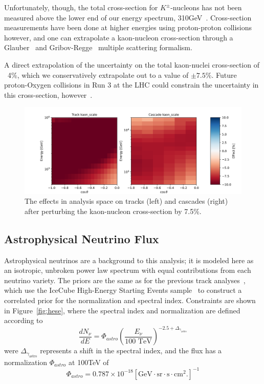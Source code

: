 \documentclass[main.tex]{subfiles}
\begin{document}
Unfortunately, though, the total cross-section for $K^{\pm}$-nucleons has not been measured above the lower end of our energy spectrum, 310GeV~\cite{PhysRevD.98.030001}. 
Cross-section measurements have been done at higher energies using proton-proton collisions however, and one can extrapolate a kaon-nucleon cross-section through a Glauber~\cite{PhysRev.100.242, GLAUBER1970135} and Gribov-Regge~\cite{Gribov:1967vfb} multiple scattering formalism. 

A direct extrapolation of the uncertainty on the total kaon-nuclei cross-section of ~4\%, which we conservatively extrapolate out to a value of $\pm 7.5$\%. 
Future proton-Oxygen collisions in Run 3 at the LHC could constrain the uncertainty in this cross-section, however~\cite{Dembinski2020dam}.

\begin{figure}
    \centering
    \includegraphics[width=0.8\linewidth]{figures/systematics/kaon_scale.png}
    \caption{The effects in analysis space on tracks (left) and cascades (right) after perturbing the kaon-nucleon cross-section by 7.5\%.}\label{fig:kaon}
\end{figure}

\subsection{Astrophysical Neutrino Flux}\label{sec:astro_flux}

Astrophysical neutrinos are a background to this analysis; it is modeled here as an isotropic, unbroken power law spectrum with equal contributions from each neutrino variety.
The priors are the same as for the previous track analyses~\cite{Aartsen_2020, Aartsen_2020_prd}, which use the IceCube High-Energy Starting Events sample~\cite{2021hese} to construct a correlated prior for the normalization and spectral index. 
Constraints are shown in Figure~\ref{fig:hese}, where the spectral index and normalization are defined according to 
\begin{equation}
    \dfrac{d N_{\nu}}{dE}  = \Phi_{astro}\left(\dfrac{E_{\nu}}{100\text{ TeV}}\right)^{-2.5 + \Delta_{\gamma_{\text{astro}}} }
\end{equation}
were $\Delta_{\gamma_{\text{astro}}}$ represents a shift in the spectral index, and the flux has a normalization $\Phi_{astro}$ at 100TeV of 
\begin{equation}
\Phi_{astro} = 0.787\times 10^{-18} \left[\text{GeV}\cdot\text{sr}\cdot\text{s}\cdot\text{cm}^{2}.\right]^{-1}
\end{equation}
\end{document}
